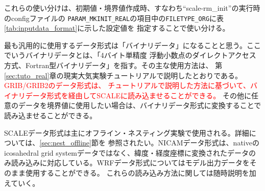 これらの使い分けは、初期値・境界値作成時、すなわち``scale-rm\_init''の実行時のconfigファイルの
\verb|PARAM_MKINIT_REAL|の項目中の\verb|FILETYPE_ORG|に表\ref{tab:inputdata_format}に示した設定値を
指定することで使い分ける。

最も汎用的に使用するデータ形式は「バイナリデータ」になることと思う。ここでいうバイナリデータとは、「4バイト単精度
浮動小数点のダイレクトアクセス方式、Fortran型バイナリデータ」を指す。その主な使用方法は、
第\ref{sec:tuto_real}章の現実大気実験チュートリアルで説明したとおりである。\textcolor{red}{GRIB/GRIB2のデータ形式は、
チュートリアルで説明した方法に基づいて、バイナリデータ形式を経由してSCALEに読み込ませることができる。}
その他に任意のデータを境界値に使用したい場合は、バイナリデータ形式に変換することで読み込ませることができる。

SCALEデータ形式は主にオフライン・ネスティング実験で使用される。詳細については、\ref{sec:nest_offline}節を
参照されたい。NICAMデータ形式は、nativeのicosahedral grid systemデータではなく、緯度・経度座標に変換されたデータの
み読み込みに対応している。WRFデータ形式についてはモデル出力データをそのまま使用することができる。
これらの読み込み方法に関しては随時説明を加えていく。






